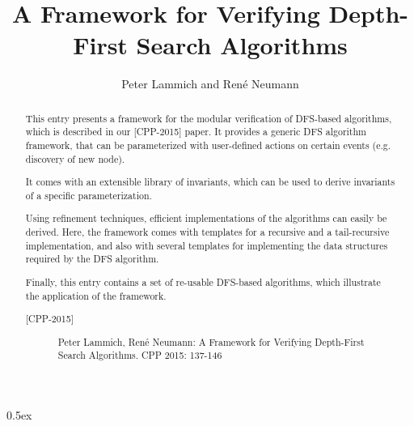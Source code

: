 \documentclass[11pt,a4paper]{report}
\begin{document}
\title{A Framework for Verifying Depth-First Search Algorithms}
\author{Peter Lammich and Ren\'{e} Neumann}
\maketitle

\begin{abstract}
This entry presents a framework for the modular verification of DFS-based 
algorithms, which is described in our [CPP-2015] paper. 
It provides a generic DFS algorithm framework, that can be 
parameterized with user-defined actions on certain events 
(e.g. discovery of new node). 

It comes with an extensible library of invariants, which can be 
used to derive invariants of a specific parameterization.

Using refinement techniques, efficient implementations of the algorithms 
can easily be derived. 
Here, the framework comes with templates for
a recursive and a tail-recursive implementation, and also with several 
templates for implementing the data structures required by the DFS algorithm.

Finally, this entry contains a set of re-usable DFS-based algorithms, which 
illustrate the application of the framework.

\vfill
{\footnotesize
\begin{description}
\item[{[{CPP-2015}]}] Peter Lammich, Ren\'{e} Neumann: A Framework for Verifying Depth-First Search Algorithms. CPP 2015: 137-146
\end{description}
}
\end{abstract}

\clearpage

\tableofcontents

\clearpage

\parindent 0pt\parskip 0.5ex



%
%
\end{document}
